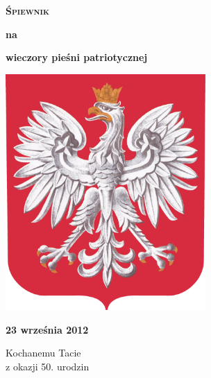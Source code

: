 \documentclass[a4paper,twoside,noinfo,nofrontmatter]{songbook}
\begin{document}
\begin{front}
\begin{titlepage}
\begin{center}
  {\VERYHUGE \bfseries\textsc{Śpiewnik}}

  \vspace{0.2in}
  {\Huge\bfseries na}
  \vspace{0.2in}
  
  {\HUGE\bfseries wieczory pieśni patriotycznej}
\end{center}
\vspace{0.5in}
\begin{center}
  \includegraphics[width=3in]{img/godlo-small.png}
\end{center}
\vspace{0.55in}
\begin{center}
  {\Huge\bfseries 23 września 2012}
\end{center}
\end{titlepage}

\begin{dedication}
  Kochanemu Tacie\\
  z okazji 50. urodzin
\end{dedication}
\end{front}



\end{document}
